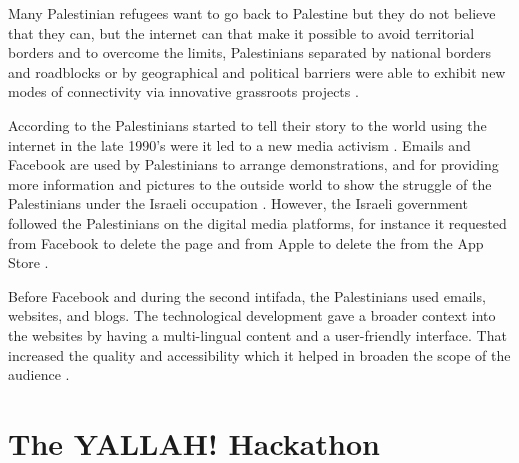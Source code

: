 Many Palestinian refugees want to go back to Palestine but they do not believe that they can, but the internet can that make it possible  
to avoid territorial borders and to overcome the limits, Palestinians separated by national borders and roadblocks or by geographical and political barriers were able to exhibit new modes of connectivity via innovative grassroots projects \citep{Aouragh2011}. 

According to \cite{Wulf2013} the Palestinians started to tell their story to the world using the internet in the late 1990's were it led to a new media activism \citep{Wulf2013}. Emails and Facebook are used by Palestinians to arrange demonstrations, and for providing more information and pictures to the outside world to show the struggle of the Palestinians under the Israeli occupation \citep{Wulf2013}. However, the Israeli government followed the Palestinians on the digital media platforms, for instance it requested from Facebook to delete the page  and from Apple to delete the  from the App Store \citep{Wulf2013}. 

Before Facebook and during the second intifada, the Palestinians used emails, websites, and blogs. The technological development gave a broader context into the websites by having a multi-lingual content and a user-friendly interface. That increased the quality and accessibility which it helped in broaden the scope of the audience \citep{Aouragh2011}. 



\section{The YALLAH! Hackathon}

